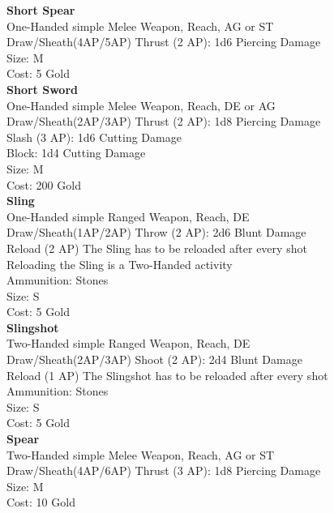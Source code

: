 \textbf{Short Spear}\label{weapon:shortSpear}\\
One-Handed simple Melee Weapon,  Reach, AG or ST\\
Draw/Sheath(4AP/5AP)
Thrust (2 AP): 1d6 Piercing Damage\\
Size: M\\
Cost: 5 Gold\\


\textbf{Short Sword}\label{weapon:shortSword}\\
One-Handed simple Melee Weapon,  Reach, DE or AG\\
Draw/Sheath(2AP/3AP)
Thrust (2 AP): 1d8 Piercing Damage\\
Slash (3 AP): 1d6 Cutting Damage\\
Block: 1d4 Cutting Damage\\
Size: M\\
Cost: 200 Gold\\


\textbf{Sling}\label{weapon:sling}\\
One-Handed simple Ranged Weapon,  Reach, DE\\
Draw/Sheath(1AP/2AP)
Throw (2 AP): 2d6 Blunt Damage\\
Reload (2 AP) The Sling has to be reloaded after every shot\\
Reloading the Sling is a Two-Handed activity\\
Ammunition: Stones\\
Size: S\\
Cost: 5 Gold\\


\textbf{Slingshot}\label{weapon:slingshot}\\
Two-Handed simple Ranged Weapon,  Reach, DE\\
Draw/Sheath(2AP/3AP)
Shoot (2 AP): 2d4 Blunt Damage\\
Reload (1 AP) The Slingshot has to be reloaded after every shot\\
Ammunition: Stones\\
Size: S\\
Cost: 5 Gold\\


\textbf{Spear}\label{weapon:spear}\\
Two-Handed simple Melee Weapon,  Reach, AG or ST\\
Draw/Sheath(4AP/6AP)
Thrust (3 AP): 1d8 Piercing Damage\\
Size: M\\
Cost: 10 Gold\\



